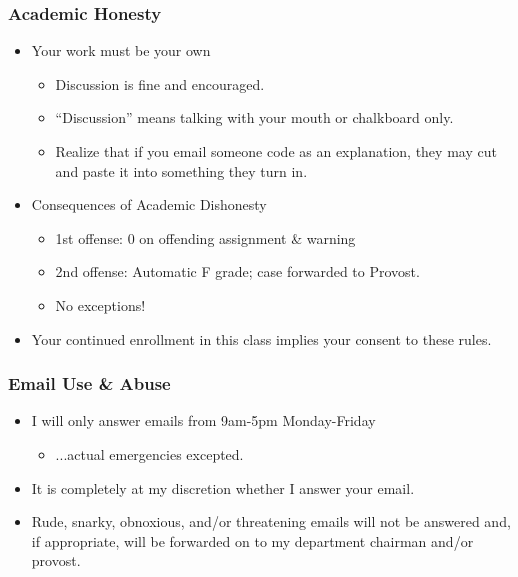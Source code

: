 \documentclass{beamer}
\begin{document}
\begin{frame}%
    \frametitle{Academic Honesty}
    
\begin{itemize}
\item Your work must be your own
\begin{itemize}
\item Discussion is fine and encouraged.
\pause
\item ``Discussion'' means talking with your mouth or chalkboard only.
\item Realize that if you email someone code as an explanation, they may cut and paste it into something they turn in.
\end{itemize}

\pause

\item Consequences of Academic Dishonesty
\begin{itemize}
\item 1st offense: 0 on offending assignment \& warning
\item 2nd offense: Automatic F grade; case forwarded to Provost.
\pause
\item No exceptions!
\end{itemize}

\pause

\item Your continued enrollment in this class implies your consent to these rules.
\end{itemize}

\end{frame}

\begin{frame}[fragile]
    \frametitle{Email Use \& Abuse}

\begin{itemize}

\item I will only answer emails from 9am-5pm Monday-Friday  
\begin{itemize}
\item ...actual emergencies excepted. 
\end{itemize}
\pause

\item It is completely at my discretion whether I answer your email.

\pause
\item Rude, snarky, obnoxious, and/or threatening emails will not be answered and, if appropriate, will be forwarded on to my department chairman and/or provost.

\end{itemize}
    
\end{frame}
\end{document}
